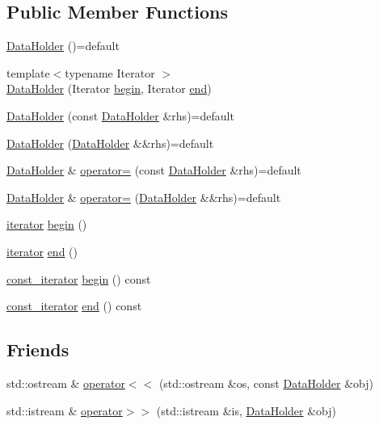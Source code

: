 \subsection*{Public Member Functions}
\begin{DoxyCompactItemize}
\item 
\hyperlink{classDataHolder_af76f72449ab22dafc1efa03084b525e5}{Data\+Holder} ()=default
\item 
{\footnotesize template$<$typename Iterator $>$ }\\\hyperlink{classDataHolder_a407d59793678968e1e4803bceeac9df5}{Data\+Holder} (Iterator \hyperlink{classDataHolder_a73bdc9101084dd53b22fdb40c877d10b}{begin}, Iterator \hyperlink{classDataHolder_a082001b8e93cf0aa1500677e4156b618}{end})
\item 
\hyperlink{classDataHolder_a62ed6b152862e8b9572187807640c586}{Data\+Holder} (const \hyperlink{classDataHolder}{Data\+Holder} \&rhs)=default
\item 
\hyperlink{classDataHolder_a6d1fdef9552e75f93c0174ec35a2fd57}{Data\+Holder} (\hyperlink{classDataHolder}{Data\+Holder} \&\&rhs)=default
\item 
\hyperlink{classDataHolder}{Data\+Holder} \& \hyperlink{classDataHolder_a3034e2aa41d6dfefcf4e60cc76bc555b}{operator=} (const \hyperlink{classDataHolder}{Data\+Holder} \&rhs)=default
\item 
\hyperlink{classDataHolder}{Data\+Holder} \& \hyperlink{classDataHolder_a16dcf3489a359c8f9c172f5178c6776f}{operator=} (\hyperlink{classDataHolder}{Data\+Holder} \&\&rhs)=default
\item 
\hyperlink{classDataHolder_afc27d248b4761952f2318a18ad5a2a15}{iterator} \hyperlink{classDataHolder_a73bdc9101084dd53b22fdb40c877d10b}{begin} ()
\item 
\hyperlink{classDataHolder_afc27d248b4761952f2318a18ad5a2a15}{iterator} \hyperlink{classDataHolder_a082001b8e93cf0aa1500677e4156b618}{end} ()
\item 
\hyperlink{classDataHolder_a396f5981e656ed389de16190968a2bf8}{const\+\_\+iterator} \hyperlink{classDataHolder_a05afb99b3d1ea784b415bae839e1c4c5}{begin} () const
\item 
\hyperlink{classDataHolder_a396f5981e656ed389de16190968a2bf8}{const\+\_\+iterator} \hyperlink{classDataHolder_a57f9f124e39a09c87bdc789fa376cb56}{end} () const
\end{DoxyCompactItemize}
\subsection*{Friends}
\begin{DoxyCompactItemize}
\item 
std\+::ostream \& \hyperlink{classDataHolder_a0f981cce0bcb94e5ad04cd86a520d5bb}{operator$<$$<$} (std\+::ostream \&os, const \hyperlink{classDataHolder}{Data\+Holder} \&obj)
\item 
std\+::istream \& \hyperlink{classDataHolder_ab300a1908af5ffa17e2106ce4d996fb6}{operator$>$$>$} (std\+::istream \&is, \hyperlink{classDataHolder}{Data\+Holder} \&obj)
\end{DoxyCompactItemize}



